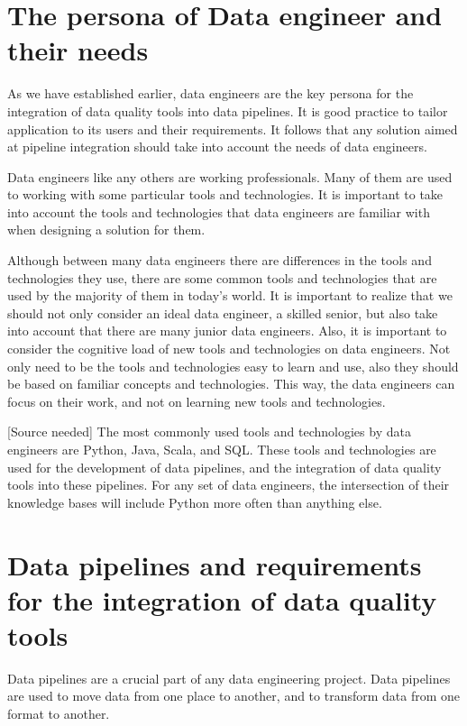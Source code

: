 \section{The persona of Data engineer and their needs}

As we have established earlier, data engineers are the key persona for the integration of data quality tools into data pipelines. It is good practice to tailor application to its users and their requirements. It follows that any solution aimed at pipeline integration should take into account the needs of data engineers.

Data engineers like any others are working professionals. Many of them are used to working with some particular tools and technologies. It is important to take into account the tools and technologies that data engineers are familiar with when designing a solution for them.

Although between many data engineers there are differences in the tools and technologies they use, there are some common tools and technologies that are used by the majority of them in today's world. It is important to realize that we should not only consider an ideal data engineer, a skilled senior, but also take into account that there are many junior data engineers. Also, it is important to consider the cognitive load of new tools and technologies on data engineers. Not only need to be the tools and technologies easy to learn and use, also they should be based on familiar concepts and technologies. This way, the data engineers can focus on their work, and not on learning new tools and technologies. 

[Source needed] The most commonly used tools and technologies by data engineers are Python, Java, Scala, and SQL. These tools and technologies are used for the development of data pipelines, and the integration of data quality tools into these pipelines. For any set of data engineers, the intersection of their knowledge bases will include Python more often than anything else.

\section{Data pipelines and requirements for the integration of data quality tools}

Data pipelines are a crucial part of any data engineering project. Data pipelines are used to move data from one place to another, and to transform data from one format to another. 

